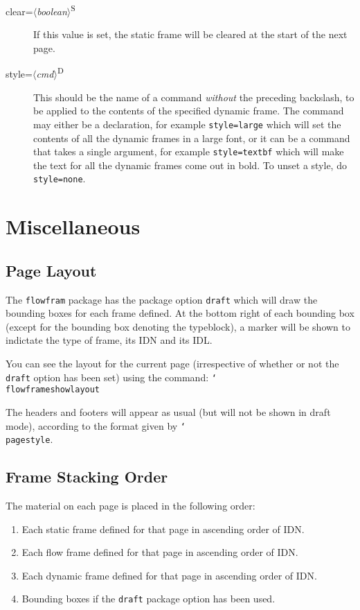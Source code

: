 \documentclass[a4paper,twoside]{report}
\newcommand{\cmdname}[1]{\texttt{\char`\\#1}}
\newcommand{\sty}[1]{\texttt{#1}}
\newcommand{\meta}[1]{$\langle$\emph{#1}$\rangle$}
\begin{document}
\begin{description}
\item[clear=\meta{boolean}\textsuperscript{S}] If this value
is set, the static frame will be cleared at the start of the
next page.

\item[style=\meta{cmd}\textsuperscript{D}] This should be
the name of a command \emph{without} the preceding backslash,
to be applied to the contents of the specified dynamic frame.
The command may either be a declaration, for example \verb/style=large/
which will set the contents of all the dynamic frames in a
large font, or it can be a command that takes a single argument,
for example \verb/style=textbf/
which will make the text for all the dynamic frames come out in
bold.  To unset a style, do \verb/style=none/.

\end{description}

\chapter{Miscellaneous}

\section{Page Layout}

The \sty{flowfram} package has the package option \texttt{draft}
which will draw the {bounding boxes} for
each frame defined.  At the bottom right of each
bounding box (except for the bounding box denoting the
typeblock), a marker will be shown to indictate the type
of frame, its IDN and its IDL.

You can see the layout for the current page (irrespective of
whether or not the \texttt{draft} option has been set) using
the command:\newline
\cmdname{flowframeshowlayout}

The headers and footers will appear as usual (but will not
be shown in draft mode), according to the format given by
\cmdname{pagestyle}.

\section{Frame Stacking Order}

The material on each page is placed in the following order:
\begin{enumerate}
\item Each static frame defined for that page in ascending
order of IDN.

\item Each flow frame defined for that page in ascending
order of IDN.

\item Each dynamic frame defined for that page in ascending
order of IDN.

\item {Bounding boxes} if the \texttt{draft}
package option has been used.
\end{enumerate}
\end{document}

